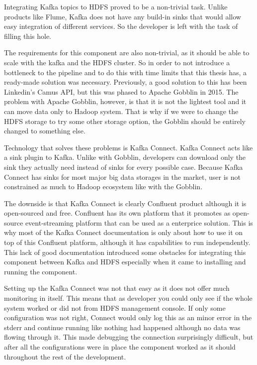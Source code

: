 Integrating Kafka topics to HDFS proved to be a non-trivial task.
Unlike products like Flume, Kafka does not have any build-in sinks that would allow easy integration of different services.
So the developer is left with the task of filling this hole.

The requirements for this component are also non-trivial, as it should be able to scale with the kafka and the HDFS cluster.
So in order to not introduce a bottleneck to the pipeline and to do this with time limits that this thesis has, a ready-made solution was necessary.
Previously, a good solution to this has been Linkedin's Camus API, but this was phased to Apache Gobblin in 2015. 
The problem with Apache Gobblin, however, is that it is not the lightest tool and it can move data only to Hadoop system.
That is why if we were to change the HDFS storage to try some other storage option, the Gobblin should be entirely changed to something else.

Technology that solves these problems is Kafka Connect. 
Kafka Connect acts like a sink plugin to Kafka.
Unlike with Gobblin, developers can download only the sink they actually need instead of sinks for every possible case.
Because Kafka Connect has sinks for most major big data storages in the market, user is not constrained as much to Hadoop ecosystem like with the Gobblin.

The downside is that Kafka Connect is clearly Confluent product although it is open-sourced and free.
Confluent has its own platform that it promotes as open-source event-streaming platform that can be used as a enterprice solution. 
This is why most of the Kafka Connect documentation is only about how to use it on top of this Confluent platform, although it has capabilities to run independently.
This lack of good documentation introduced some obstacles for integrating this component between Kafka and HDFS especially when it came to installing and running the component.

Setting up the Kafka Connect was not that easy as it does not offer much monitoring in itself.
This means that as developer you could only see if the whole system worked or did not from HDFS management console.
If only some configuration was not right, Connect would only log this as an minor error in the stderr and continue running like nothing had happened although no data was flowing through it.
This made debugging the connection surprisingly difficult, but after all the configurations were in place the component worked as it should throughout the rest of the development.

